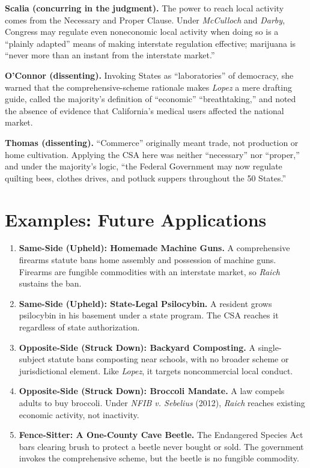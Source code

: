 \documentclass[12pt]{article}
\begin{document}
\textbf{Scalia (concurring in the judgment).} The power to reach local activity comes from the Necessary and Proper Clause. Under \textit{McCulloch} and \textit{Darby}, Congress may regulate even noneconomic local activity when doing so is a ``plainly adapted'' means of making interstate regulation effective; marijuana is ``never more than an instant from the interstate market.''

\textbf{O'Connor (dissenting).} Invoking States as ``laboratories'' of democracy, she warned that the comprehensive-scheme rationale makes \textit{Lopez} a mere drafting guide, called the majority's definition of ``economic'' ``breathtaking,'' and noted the absence of evidence that California's medical users affected the national market.

\textbf{Thomas (dissenting).} ``Commerce'' originally meant trade, not production or home cultivation. Applying the CSA here was neither ``necessary'' nor ``proper,'' and under the majority's logic, ``the Federal Government may now regulate quilting bees, clothes drives, and potluck suppers throughout the 50 States.''

\section{Examples: Future Applications}

\begin{enumerate}
\item \textbf{Same-Side (Upheld): Homemade Machine Guns.} A comprehensive firearms statute bans home assembly and possession of machine guns. Firearms are fungible commodities with an interstate market, so \textit{Raich} sustains the ban.
\item \textbf{Same-Side (Upheld): State-Legal Psilocybin.} A resident grows psilocybin in his basement under a state program. The CSA reaches it regardless of state authorization.
\item \textbf{Opposite-Side (Struck Down): Backyard Composting.} A single-subject statute bans composting near schools, with no broader scheme or jurisdictional element. Like \textit{Lopez}, it targets noncommercial local conduct.
\item \textbf{Opposite-Side (Struck Down): Broccoli Mandate.} A law compels adults to buy broccoli. Under \textit{NFIB v. Sebelius} (2012), \textit{Raich} reaches existing economic activity, not inactivity.
\item \textbf{Fence-Sitter: A One-County Cave Beetle.} The Endangered Species Act bars clearing brush to protect a beetle never bought or sold. The government invokes the comprehensive scheme, but the beetle is no fungible commodity.
\end{enumerate}
\end{document}
